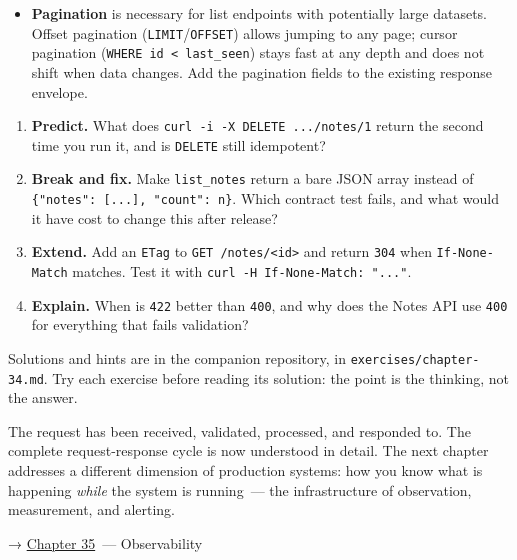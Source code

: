 \begin{takeaways}
\begin{itemize}
\item
  \textbf{Pagination} is necessary for list endpoints with potentially large datasets. Offset pagination (\texttt{LIMIT}/\texttt{OFFSET}) allows jumping to any page; cursor pagination (\texttt{WHERE\ id\ \textless{}\ last\_seen}) stays fast at any depth and does not shift when data changes. Add the pagination fields to the existing response envelope.
\end{itemize}

\end{takeaways}

\label{34-response-handling:exercises}

\begin{enumerate}
\def\labelenumi{\arabic{enumi}.}
\tightlist
\item
  \textbf{Predict.} What does \texttt{curl\ -}\allowbreak{}\texttt{i\ -}\allowbreak{}\texttt{X\ DELETE\ .}\allowbreak{}\texttt{.}\allowbreak{}\texttt{.}\allowbreak{}\texttt{/}\allowbreak{}\texttt{notes/}\allowbreak{}\texttt{1} return the second time you run it, and is \texttt{DELETE} still idempotent?
\item
  \textbf{Break and fix.} Make \texttt{list\_notes} return a bare JSON array instead of \texttt{\{"notes":}\allowbreak{}\texttt{\ {[}.}\allowbreak{}\texttt{.}\allowbreak{}\texttt{.}\allowbreak{}\texttt{{]},}\allowbreak{}\texttt{\ "count":}\allowbreak{}\texttt{\ n\}}. Which contract test fails, and what would it have cost to change this after release?
\item
  \textbf{Extend.} Add an \texttt{ETag} to \texttt{GET\ /notes/\textless{}id\textgreater{}} and return \texttt{304} when \texttt{If-None-Match} matches. Test it with \texttt{curl\ -}\allowbreak{}\texttt{H\ \textquotesingle{}If-}\allowbreak{}\texttt{None-}\allowbreak{}\texttt{Match:}\allowbreak{}\texttt{\ ".}\allowbreak{}\texttt{.}\allowbreak{}\texttt{.}\allowbreak{}\texttt{"\textquotesingle{}}.
\item
  \textbf{Explain.} When is \texttt{422} better than \texttt{400}, and why does the Notes API use \texttt{400} for everything that fails validation?
\end{enumerate}

\noindent{}Solutions and hints are in the companion repository, in \texttt{exercises/}\allowbreak{}\texttt{chapter-34.md}. Try each exercise before reading its solution: the point is the thinking, not the answer.

\label{34-response-handling:whats-next}

The request has been received, validated, processed, and responded to. The complete request-response cycle is now understood in detail. The next chapter addresses a different dimension of production systems: how you know what is happening \emph{while} the system is running~--- the infrastructure of observation, measurement, and alerting.

\noindent{}→ \hyperref[ch:35-observability]{Chapter 35}~--- Observability
